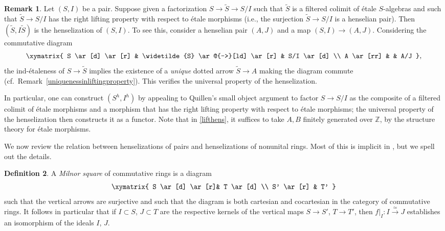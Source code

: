 \documentclass{amsart}
\theoremstyle{definition}
\newtheorem{definition}{Definition}[section]
\newtheorem{remark}[definition]{Remark}
\newcommand{\isoto}{\stackrel{\simeq}{\to}}
\begin{document}
\begin{remark} 
\label{hensfact}
Let $(S, I)$ be a pair. Suppose given a factorization $S \to \widetilde{S} \to
S/I$ such that
$\widetilde{S}$ is a filtered colimit of \'etale $S$-algebras and such that
$\widetilde{S} \to S/I$ has the right lifting property with respect to \'etale
morphisms (i.e., the surjection $\widetilde{S} \to S/I$ is a henselian pair). Then $(\widetilde{S}, I \widetilde{S})$ is the henselization of $(S,
I)$. To see this, 
consider a henselian pair $(A, J)$ and a map $(S, I) \to (A, J)$. Considering
the commutative diagram
\[ \xymatrix{
S \ar[d] \ar[r] & \widetilde{S} \ar@{-->}[ld] \ar[r] &  S/I \ar[d]  \\
A \ar[rr] & & A/J
},\]
the ind-\'etaleness of $S \to \widetilde{S}$ implies the existence of a
\emph{unique}
dotted arrow $\widetilde{S} \to A$ making the diagram commute
(cf.~Remark~\ref{uniquenessinliftingproperty}). This verifies the
universal property of the henselization. 

In particular, one can construct $(S^h, I^h)$ by appealing to Quillen's small object argument 
\cite[Th. 2.1.14]{Hovey} to factor $S \to S/I$ as the composite of a filtered colimit of
\'etale morphisms and a morphism that has the right lifting property with
respect to \'etale morphisms; the universal property 
of the henselization then constructs it as a functor. Note that in \eqref{lifthens}, it suffices to take
$A, B$ finitely generated over $\mathbb{Z}$, by the structure theory for \'etale
morphisms.
\end{remark} 


We now review the relation between henselizations of pairs and
henselizations of nonunital rings. Most of this is implicit in \cite{gabber}, but we spell out the details.

\begin{definition} 
\label{milnorsquare}
A \emph{Milnor square} of commutative rings is a diagram
\begin{equation}  \xymatrix{
S \ar[d] \ar[r]&  T \ar[d]  \\
S'  \ar[r] &  T'
} \label{milnsquare} \end{equation} 
such that the vertical arrows are surjective and such that the diagram is both
cartesian and cocartesian in the category of commutative rings. 
It follows in particular that 
if $I \subset S$, $J \subset T$
are the respective kernels of the vertical maps $S \to S'$, $T \to T'$, then $f|_I
: I \isoto J$ establishes an isomorphism of the ideals $I$, $J$. 
\end{definition} 
\end{document}
